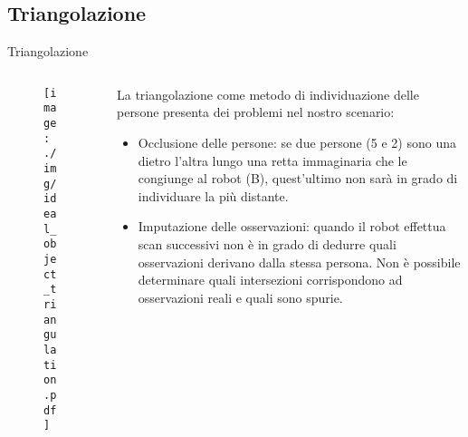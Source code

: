 \documentclass[10pt]{beamer}
\begin{document}
	\subsection{Triangolazione}\label{subsec:Triangolazione}
	\begin{frame}{Triangolazione}
		\begin{columns}
			\begin{column}{0.4\textwidth}
				\begin{figure}[htpb]
					\centering
					\texttt{[image: ./img/ideal\_object\_triangulation.pdf]}
					\label{fig:triangulation}
				\end{figure}
			\end{column}

			\begin{column}{0.6\textwidth}
				\justifying
				La triangolazione come metodo di individuazione delle persone
				presenta dei problemi nel nostro scenario:
				\begin{itemize}
					\justifying
					\pause\item Occlusione delle persone: se due persone
						(5 e 2) sono una dietro l'altra lungo una retta
						immaginaria che le congiunge al robot (B), quest'ultimo
						non sarà in grado di individuare la più distante. 

					\pause\item Imputazione delle osservazioni: quando il robot
						effettua scan successivi non è in grado di dedurre
						quali osservazioni derivano dalla stessa persona.
						Non è possibile determinare quali intersezioni
						corrispondono ad osservazioni reali e quali sono spurie. 

				\end{itemize}
			\end{column}
		\end{columns}
	\end{frame}
	
\end{document}
